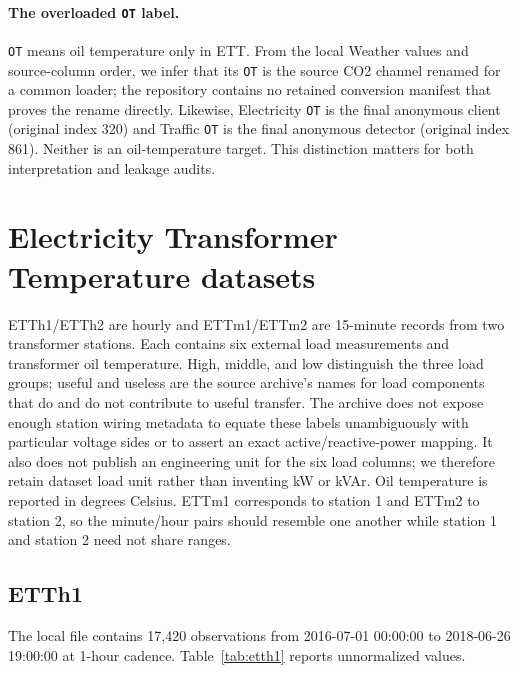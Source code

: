 \documentclass[10pt]{article}
\newcommand{\datasetunit}{dataset load unit}
\begin{document}
\paragraph{The overloaded \texttt{OT} label.}
\texttt{OT} means oil temperature only in ETT. From the local Weather values and source-column order, we infer that its \texttt{OT} is the source CO2 channel renamed for a common loader; the repository contains no retained conversion manifest that proves the rename directly. Likewise, Electricity \texttt{OT} is the final anonymous client (original index 320) and Traffic \texttt{OT} is the final anonymous detector (original index 861). Neither is an oil-temperature target. This distinction matters for both interpretation and leakage audits.


\section{Electricity Transformer Temperature datasets}

ETTh1/ETTh2 are hourly and ETTm1/ETTm2 are 15-minute records from two transformer stations. Each contains six external load measurements and transformer oil temperature. High, middle, and low distinguish the three load groups; useful and useless are the source archive's names for load components that do and do not contribute to useful transfer. The archive does not expose enough station wiring metadata to equate these labels unambiguously with particular voltage sides or to assert an exact active/reactive-power mapping. It also does not publish an engineering unit for the six load columns; we therefore retain \datasetunit{} rather than inventing kW or kVAr. Oil temperature is reported in degrees Celsius. ETTm1 corresponds to station 1 and ETTm2 to station 2, so the minute/hour pairs should resemble one another while station 1 and station 2 need not share ranges.

\subsection{ETTh1}

The local file contains 17,420 observations from 2016-07-01 00:00:00 to 2018-06-26 19:00:00 at 1-hour cadence. Table~\ref{tab:etth1} reports unnormalized values.
\end{document}
